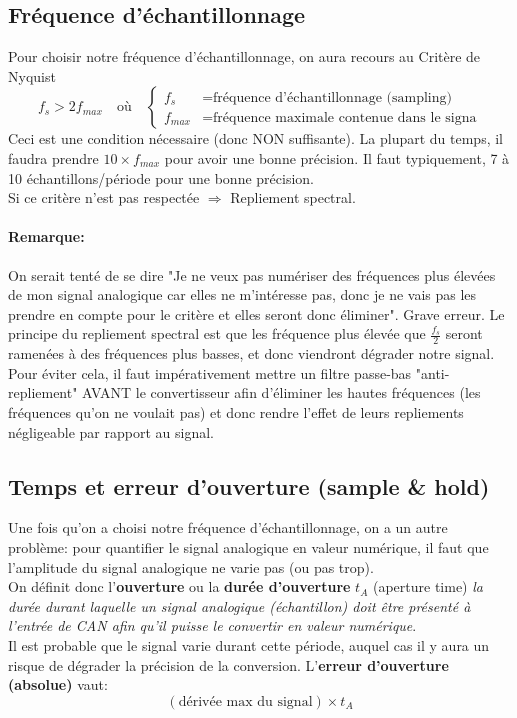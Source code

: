 \subsection{Fréquence d'échantillonnage}
Pour choisir notre fréquence d'échantillonnage, on aura recours au Critère de Nyquist
\[f_s>2f_{max}\quad\text{où}\quad \left\{\begin{array}{ll}
f_s &= \text{fréquence d'échantillonnage (sampling)}\\
f_{max} &= \text{fréquence maximale contenue dans le signa}
\end{array}\right.\]
Ceci est une condition nécessaire (donc NON suffisante). La plupart du temps, il faudra prendre \(10\times f_{max}\) pour avoir une bonne précision. Il faut typiquement, 7 à 10 échantillons/période pour une bonne précision.\\
Si ce critère n'est pas respectée \(\Rightarrow\) Repliement spectral.
\paragraph{Remarque:} On serait tenté de se dire "Je ne veux pas numériser des fréquences plus élevées de mon signal analogique car elles ne m'intéresse pas, donc je ne vais pas les prendre en compte pour le critère et elles seront donc éliminer". Grave erreur. Le principe du repliement spectral est que les fréquence plus élevée que \(\frac{f_s}{2}\) seront ramenées à des fréquences plus basses, et donc viendront dégrader notre signal. Pour éviter cela, il faut impérativement mettre un filtre passe-bas "anti-repliement" AVANT le convertisseur afin d'éliminer les hautes fréquences (les fréquences qu'on ne voulait pas) et donc rendre l'effet de leurs repliements négligeable par rapport au signal.
\subsection{Temps et erreur d'ouverture (sample \& hold)}
Une fois qu'on a choisi notre fréquence d'échantillonnage, on a un autre problème: pour quantifier le signal analogique en valeur numérique, il faut que l'amplitude du signal analogique ne varie pas (ou pas trop).\\
On définit donc l'\textbf{ouverture} ou la \textbf{durée d'ouverture} \(t_A\) (aperture time) \emph{la durée durant laquelle un signal analogique (échantillon) doit être présenté à l'entrée de CAN afin qu'il puisse le convertir en valeur numérique}.\\
Il est probable que le signal varie durant cette période, auquel cas il y aura un risque de dégrader la précision de la conversion. L'\textbf{erreur d'ouverture (absolue)} vaut: \[(\text{dérivée max du signal})\times t_A\]

